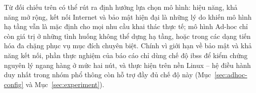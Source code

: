 Từ đối chiếu trên có thể rút ra định hướng lựa chọn mô hình: hiệu năng, khả năng
mở rộng, kết nối Internet và bảo mật hiện đại là những lý do khiến mô hình hạ
tầng vẫn là mặc định cho mọi nhu cầu khai thác thực tế; mô hình Ad-hoc chỉ còn
giá trị ở những tình huống không thể dựng hạ tầng, hoặc trong các dạng tiến hóa
đa chặng phục vụ mục đích chuyên biệt. Chính vì giới hạn về bảo mật và khả năng
kết nối, phần thực nghiệm của báo cáo chỉ dùng chế độ \ac{ibss} để kiểm chứng
nguyên lý ngang hàng ở mức hai nút, và thực hiện trên nền Linux -- hệ điều hành
duy nhất trong nhóm phổ thông còn hỗ trợ đầy đủ chế độ này
(Mục~\ref{sec:adhoc-config} và Mục~\ref{sec:experiment}).

\endgroup
